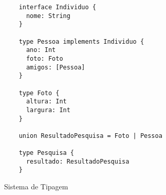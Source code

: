 \begin{figure}[H]
  \centering
  \begin{verbatim}
    interface Individuo {
      nome: String
    }

    type Pessoa implements Individuo {
      ano: Int
      foto: Foto
      amigos: [Pessoa]
    }

    type Foto {
      altura: Int
      largura: Int
    }

    union ResultadoPesquisa = Foto | Pessoa

    type Pesquisa {
      resultado: ResultadoPesquisa
    }
  \end{verbatim}
  \caption{Sistema de Tipagem}
\end{figure}
